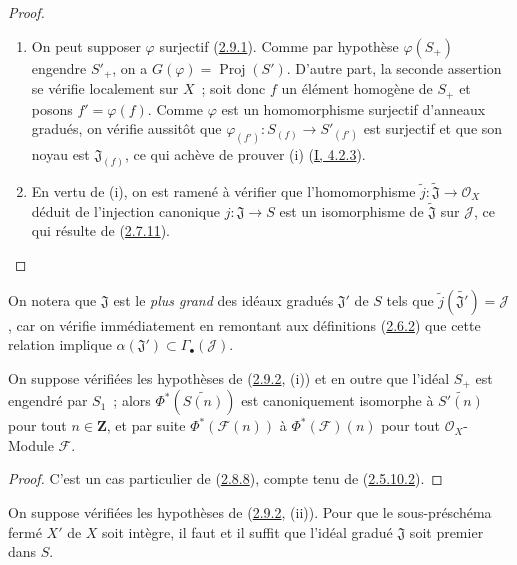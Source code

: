 \begin{proof}
\begin{enumerate}
  \item[\rm(i)] On peut supposer $\varphi$ surjectif
    (\hyperref[II.2.9.1-fr]{2.9.1}). Comme par hypothèse
    $\varphi(S_+)$ engendre $S'_+$, on a
    $G(\varphi)=\operatorname{Proj}(S')$. D'autre part, la seconde assertion
    se vérifie localement sur $X$~; soit donc $f$ un élément homogène de
    $S_+$ et posons $f'=\varphi(f)$. Comme $\varphi$ est un homomorphisme
    surjectif d'anneaux gradués, on vérifie aussitôt que
    $\varphi_{(f')}:S_{(f)}\to S'_{(f')}$ est surjectif et que son noyau est
    $\mathfrak{J}_{(f)}$, ce qui achève de prouver (i)
    (\hyperref[I.4.2.3-fr]{I, 4.2.3}).
  \item[\rm(ii)] En vertu de (i), on est ramené à vérifier que
    l'homomorphisme $\widetilde{j}:\widetilde{\mathfrak{J}}\to\mathcal{O}_X$
    déduit de l'injection canonique $j:\mathfrak{J}\to S$ est un
    isomorphisme de $\widetilde{\mathfrak{J}}$ sur $\mathcal{J}$, ce qui
    résulte de (\hyperref[II.2.7.11-fr]{2.7.11}).
\end{enumerate}
\end{proof}

On notera que $\mathfrak{J}$ est le \emph{plus grand} des idéaux gradués
$\mathfrak{J}'$ de $S$ tels que
$\widetilde{j}(\widetilde{\mathfrak{J}'})=\mathcal{J}$, car on vérifie
immédiatement en remontant aux définitions
(\hyperref[II.2.6.2-fr]{2.6.2}) que cette relation implique
$\alpha(\mathfrak{J}')\subset\Gamma_\bullet(\mathcal{J})$.

\begin{corollary}[2.9.3]
\label{II.2.9.3-fr}
On suppose vérifiées les hypothèses de
(\hyperref[II.2.9.2-fr]{2.9.2}, (i)) et en outre que l'idéal $S_+$ est
engendré par $S_1$~; alors $\Phi^*(\widetilde{S(n)})$ est canoniquement
isomorphe à $\widetilde{S'(n)}$ pour tout $n\in\mathbf{Z}$, et par suite
$\Phi^*(\mathcal{F}(n))$ à $\Phi^*(\mathcal{F})(n)$ pour tout
$\mathcal{O}_X$-Module $\mathcal{F}$.
\end{corollary}

\begin{proof}
C'est un cas particulier de (\hyperref[II.2.8.8-fr]{2.8.8}), compte tenu de
(\hyperref[II.2.5.10.2-fr]{2.5.10.2}).
\end{proof}

\begin{corollary}[2.9.4]
\label{II.2.9.4-fr}
On suppose vérifiées les hypothèses de
(\hyperref[II.2.9.2-fr]{2.9.2}, (ii)). Pour que le sous-préschéma fermé $X'$
de $X$ soit intègre, il faut et il suffit que l'idéal gradué
$\mathfrak{J}$ soit premier dans $S$.
\end{corollary}

